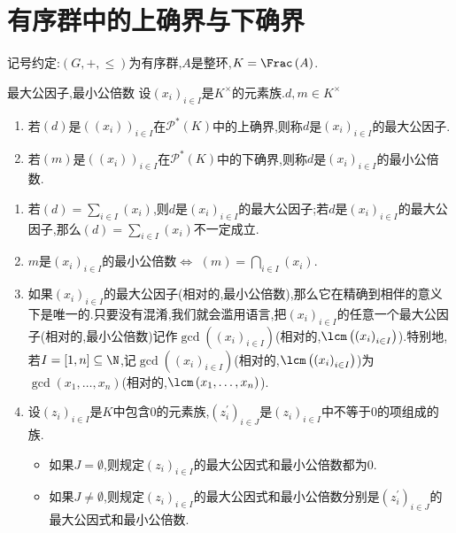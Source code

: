 \section{有序群中的上确界与下确界}

记号约定:$\left(G,+,\leq\right)$为有序群,$A$是整环,$K=\Frac\left(A\right)$.

\begin{definition}{最大公因子,最小公倍数}{}
	设$\left(x_{i}\right)_{i\in I}$是$K^{\times}$的元素族.$d,m\in K^{\times}$
	\begin{enumerate}
		\item 若$\left(d\right)$是$\left(\left(x_{i}\right)\right)_{i\in I}$在$\mathscr{P}^{\ast}\left(K\right)$中的上确界,则称$d$是$\left(x_{i}\right)_{i\in I}$的最大公因子.
		\item 若$\left(m\right)$是$\left(\left(x_{i}\right)\right)_{i\in I}$在$\mathscr{P}^{\ast}\left(K\right)$中的下确界,则称$d$是$\left(x_{i}\right)_{i\in I}$的最小公倍数.
	\end{enumerate}
\end{definition}

\begin{remark}{}{}
	\begin{enumerate}
		\item 若$\left(d\right)=\sum\limits_{i\in I}\left(x_{i}\right)$,则$d$是$\left(x_{i}\right)_{i\in I}$的最大公因子;若$d$是$\left(x_{i}\right)_{i\in I}$的最大公因子,那么$\left(d\right)=\sum\limits_{i\in I}\left(x_{i}\right)$不一定成立.
		\item $m$是$\left(x_{i}\right)_{i\in I}$的最小公倍数$\iff$ $\left(m\right)=\bigcap\limits_{i\in I}\left(x_{i}\right)$.
		\item 如果$\left(x_{i}\right)_{i\in I}$的最大公因子(相对的,最小公倍数),那么它在精确到相伴的意义下是唯一的.只要没有混淆,我们就会滥用语言,把$\left(x_{i}\right)_{i\in I}$的任意一个最大公因子(相对的,最小公倍数)记作$\gcd\left(\left(x_{i}\right)_{i\in I}\right)$(相对的,$\lcm\left(\left(x_{i}\right)_{i\in I}\right)$).特别地,若$I=\left[1,n\right]\subseteq\N$,记$\gcd\left(\left(x_{i}\right)_{i\in I}\right)$(相对的,$\lcm\left(\left(x_{i}\right)_{i\in I}\right)$)为$\gcd\left(x_{1},\ldots,x_{n}\right)$(相对的,$\lcm\left(x_{1},\ldots,x_{n}\right)$).
		\item 设$\left(z_{i}\right)_{i\in I}$是$K$中包含$0$的元素族,$\left(z_{i}^{\prime}\right)_{i\in J}$是$\left(z_{i}\right)_{i\in I}$中不等于$0$的项组成的族.
		\begin{itemize}
			\item 如果$J=\emptyset$,则规定$\left(z_{i}\right)_{i\in I}$的最大公因式和最小公倍数都为$0$.
			\item 如果$J\neq\emptyset$,则规定$\left(z_{i}\right)_{i\in I}$的最大公因式和最小公倍数分别是$\left(z_{i}^{\prime}\right)_{i\in J}$的最大公因式和最小公倍数.
		\end{itemize}
	\end{enumerate}
\end{remark}

